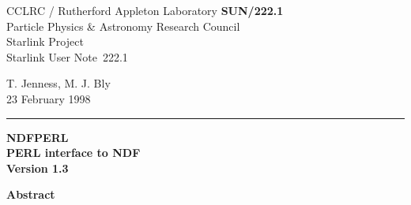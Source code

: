 \documentclass[twoside,11pt]{article}
\newcommand{\stardoccategory}  {Starlink User Note}
\newcommand{\stardocinitials}  {SUN}
\newcommand{\stardocnumber}    {222.1}
\newcommand{\stardocauthors}   {T. Jenness, M. J. Bly}
\newcommand{\stardocdate}      {23 February 1998}
\newcommand{\stardoctitle}     {NDFPERL \\ [2ex] PERL interface to NDF}
\newcommand{\stardocversion}   {Version 1.3}
\newcommand{\stardocmanual}    {}
\newcommand{\stardocname}{\stardocinitials /\stardocnumber}
\newenvironment{latexonly}{}{}
\begin{document}
\thispagestyle{empty}

\begin{latexonly}
   CCLRC / {\sc Rutherford Appleton Laboratory} \hfill {\bf \stardocname}\\
   {\large Particle Physics \& Astronomy Research Council}\\
   {\large Starlink Project\\}
   {\large \stardoccategory\ \stardocnumber}
   \begin{flushright}
   \stardocauthors\\
   \stardocdate
   \end{flushright}
   \vspace{-4mm}
   \rule{\textwidth}{0.5mm}
   \vspace{5mm}
   \begin{center}
   {\Huge\bf  \stardoctitle \\ [2.5ex]}
   {\LARGE\bf \stardocversion \\ [4ex]}
   \end{center}
   \vspace{5mm}


   \vspace{10mm}
   \begin{center}
      {\Large\bf Abstract}
   \end{center}
\end{latexonly}
\end{document}
